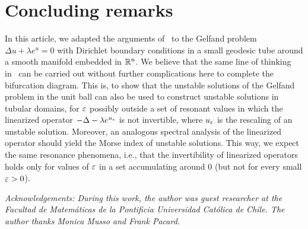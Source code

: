 \section{Concluding remarks}

In this article, we adapted the arguments
of~\cite{Pacard2014,stable-solutions-elliptic} to the Gelfand problem $\Delta u
+ \lambda e^u=0$ with Dirichlet boundary conditions in a small geodesic tube
around a smooth manifold embedded in $\mathbb{R}^n$.
We believe that the same line of thinking in~\cite{Pacard2014} can be
carried out without further complications here to complete the bifurcation diagram.
This is, to show that the unstable
solutions of the Gelfand problem in the unit ball can also be used to construct
unstable solutions in tubular domains, for $\varepsilon$ possibly outside a set of
resonant values in which the linearized operator $-\Delta - \lambda e^{u_\varepsilon}$
is not invertible, where $u_\varepsilon$ is the rescaling of an unstable solution. Moreover,
an analogous spectral analysis of the linearized operator should yield the
Morse index of unstable solutions. This way, we expect the same resonance phenomena,
i.e., that the invertibility of linearized operators holds only for values of $\varepsilon$
in a set accumulating around 0 (but not for every small $\varepsilon>0$).

\medskip

\textit{Acknowledgements: During this work, the author was guest
    researcher at the Facultad de Matem\'aticas de la Pontificia Universidad
    Cat\'olica de Chile. The author thanks Monica Musso and Frank Pacard.}
